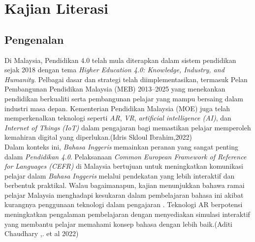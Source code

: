 \chapter{Kajian Literasi}
\section{Pengenalan}


Di Malaysia, Pendidikan 4.0 telah mula diterapkan dalam sistem pendidikan sejak 2018 dengan tema \textit{Higher Education 4.0: Knowledge, Industry, and Humanity}. Pelbagai dasar dan strategi telah diimplementasikan, termasuk Pelan Pembangunan Pendidikan Malaysia (MEB) 2013--2025 yang menekankan pendidikan berkualiti serta pembangunan pelajar yang mampu bersaing dalam industri masa depan. Kementerian Pendidikan Malaysia (MOE) juga telah memperkenalkan teknologi seperti \textit{AR}, \textit{VR}, \textit{artificial intelligence (AI)}, dan \textit{Internet of Things (IoT)} dalam pengajaran bagi memastikan pelajar memperoleh kemahiran digital yang diperlukan.(Idris Skloul Ibrahim,2022)\\

\hspace{1cm}Dalam konteks ini, \textit{Bahasa Inggeris} memainkan peranan yang sangat penting dalam \textit{Pendidikan 4.0}. Pelaksanaan \textit{Common European Framework of Reference for Languages (CEFR)} di Malaysia bertujuan untuk meningkatkan komunikasi pelajar dalam \textit{Bahasa Inggeris} melalui pendekatan yang lebih interaktif dan berbentuk praktikal. Walau bagaimanapun, kajian menunjukkan bahawa ramai pelajar Malaysia menghadapi kesukaran dalam pembelajaran bahasa ini akibat kurangnya penggunaan teknologi dalam pengajaran \cite{zainuddin2021}. Teknologi AR berpotensi meningkatkan pengalaman pembelajaran dengan menyediakan simulasi interaktif yang membantu pelajar memahami konsep bahasa dengan lebih baik.(Aditi Chaudhary ,. et al 2022)\\

